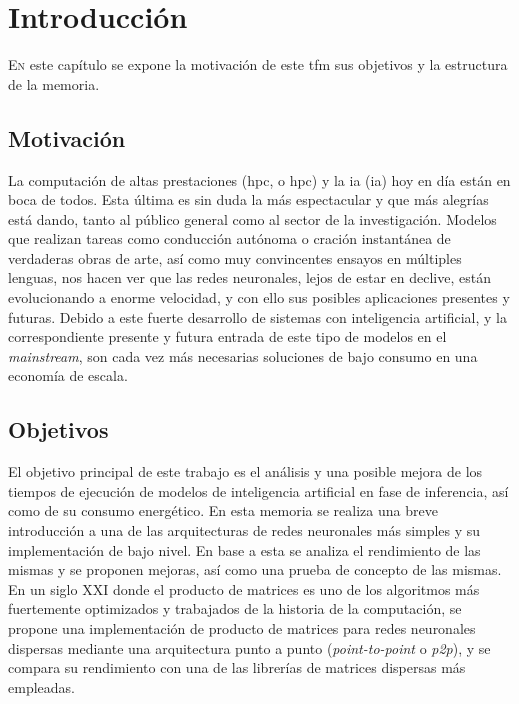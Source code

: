 \chapter{Introducción}
\label{chap:introducion}

\lettrine{E}{n} este capítulo se expone la motivación de este \acrlong{tfm} sus objetivos y la estructura de la memoria.

\section{Motivación}
\label{sec:motivacion}
La computación de altas prestaciones (\acrshort{hpc}, o \acrlong{hpc}) y la \acrlong{ia} (\acrshort{ia}) hoy en día están en boca de todos. Esta última es sin duda la más espectacular y que más alegrías está dando, tanto al público general como al sector de la investigación.
Modelos que realizan tareas como conducción autónoma o cración instantánea de verdaderas obras de arte, así como muy convincentes ensayos en múltiples lenguas, nos hacen ver que las redes neuronales, lejos de estar en declive, están evolucionando a enorme velocidad, y con ello sus posibles aplicaciones presentes y futuras. Debido a este fuerte desarrollo de sistemas con inteligencia artificial, y la correspondiente presente y futura entrada de este tipo de modelos en el \textit{mainstream}, son cada vez más necesarias soluciones de bajo consumo en una economía de escala.

\section{Objetivos}
\label{sec:objetivos}
El objetivo principal de este trabajo es el análisis y una posible mejora de los tiempos de ejecución de modelos de inteligencia artificial en fase de inferencia, así como de su consumo energético. En esta memoria se realiza una breve introducción a una de las arquitecturas de redes neuronales más simples y su implementación de bajo nivel. En base a esta se analiza el rendimiento de las mismas y se proponen mejoras, así como una prueba de concepto de las mismas. En un siglo XXI donde el producto de matrices es uno de los algoritmos más fuertemente optimizados y trabajados de la historia de la computación, se propone una implementación de producto de matrices para redes neuronales dispersas mediante una arquitectura punto a punto (\textit{point-to-point} o \textit{p2p}), y se compara su rendimiento con una de las librerías de matrices dispersas más empleadas.

